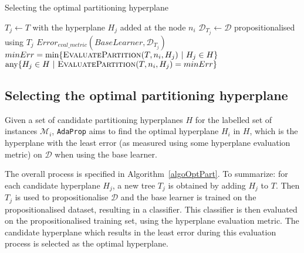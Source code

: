 \documentclass[a4paper,12pt]{report} %
\newcommand{\AdaProp}{\texttt{AdaProp}\xspace}
\newcommand{\mcl}[1]{\mathcal{#1}}
\begin{document}
\begin{algorithm}
\caption{Selecting the optimal partitioning hyperplane}
\label{algoOptPart} 
\begin{algorithmic}
    \State $T_j \gets T$ with the hyperplane $H_j$ added at the node $n_i$
        \State $\mcl{D}_{T_j} \gets \mcl{D}$ propositionalised using $T_j$
        \State \Return $Error_{eval\_metric}(BaseLearner,\mcl{D}_{T_j})$
    \EndFunction
    \State 
    \State $minErr = \min \{ \textrm{\sc EvaluatePartition}(T,n_i,H_j) ~|~ H_j \in H \}$
    \State \Return $\textrm{any} \{ H_j \in H ~|~ \textrm{\sc EvaluatePartition}(T,n_i,H_j) = minErr \}$
    \EndFunction
\end{algorithmic}
\end{algorithm}

\subsection{Selecting the optimal partitioning hyperplane}
\label{secOptPartition}

Given a set of candidate partitioning hyperplanes $H$ for the labelled set of instances $\mcl{M}_i$, 
    \AdaProp aims to find the optimal hyperplane $H_i$ in $H$, 
    which is the hyperplane with the least
    error (as measured using some hyperplane evaluation metric)
     on $\mcl{D}$ when using the base learner.     
     
The overall process is specified in Algorithm~\ref{algoOptPart}.
To summarize: for each candidate hyperplane $H_j$,
    a new tree $T_j$ is obtained by adding $H_j$ to $T$.
Then $T_j$ is used to propositionalise $\mcl{D}$
    and the base learner is trained on the propositionalised dataset, 
    resulting in a classifier.
This classifier is then evaluated on the propositionalised training set, 
	using the hyperplane evaluation metric.
The candidate hyperplane which results in the least error during this 
	evaluation process is selected as the 
    optimal hyperplane.
\end{document}
